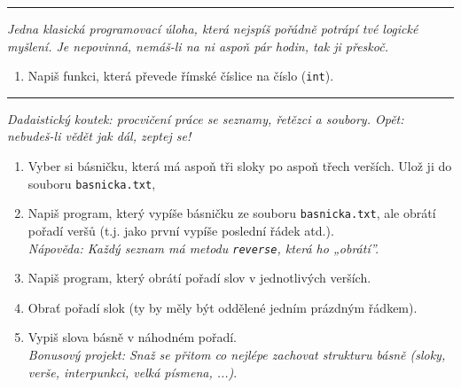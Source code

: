 \documentclass[a4paper,10pt]{article}
\newcommand\startsection[1]{
     \vspace{0.2ex}
    \hrule
    {\fontspec{Oxygen} \tiny
     \vspace{-1ex}
     \emph{#1}
     \vspace{-1.5em}
    }
}
\begin{document}

\startsection{Jedna klasická programovací úloha, která nejspíš pořádně potrápí
    tvé logické myšlení. Je nepovinná, nemáš-li na ni aspoň pár hodin,
    tak ji přeskoč.}

\begin{enumerate}[resume]

\item Napiš funkci, která převede římské číslice na číslo (\verb+int+).

\end{enumerate}

\startsection{Dadaistický koutek: procvičení práce se seznamy, řetězci
    a soubory. Opět: nebudeš-li vědět jak dál, zeptej se!}

\begin{enumerate}[resume]

\item Vyber si básničku, která má aspoň tři sloky po aspoň třech verších.
    Ulož ji do souboru \verb+basnicka.txt+,

\item Napiš program, který vypíše básničku ze souboru \verb+basnicka.txt+,
    ale obrátí pořadí veršů (t.j. jako první vypíše poslední řádek atd.).
    \\\emph{Nápověda: Každý seznam má metodu \texttt{reverse}, která ho „obrátí”.}

\item Napiš program, který obrátí pořadí slov v jednotlivých verších.

\item Obrať pořadí slok (ty by měly být oddělené jedním prázdným řádkem).

\item Vypiš slova básně v náhodném pořadí.
    \\\emph{Bonusový projekt: Snaž se přitom co nejlépe zachovat strukturu básně
        (sloky, verše, interpunkci, velká písmena, ...)}.

\end{enumerate}
\end{document}
